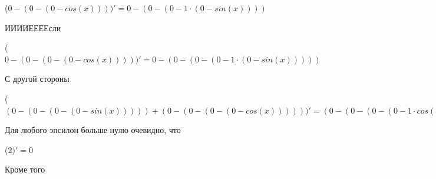 \documentclass[12pt,a4paper,fleqn]{article}
\begin{document}
\begin{center}
\begin{center}
\begin{center}
\begin{center}
\begin{center}
\begin{center}
\begin{center}
\begin{center}
\begin{center}
\begin{center}
\begin{center}
\begin{center}
\begin{center}
\begin{center}
\begin{center}
\begin{center}
\begin{center}
\begin{center}
\begin{center}
\begin{center}
\begin{center}
\begin{center}
\begin{center}
\begin{center}
\begin{center}
\begin{center}
\begin{center}
\begin{center}
\begin{center}
\begin{center}
\begin{center}
\begin{center}
\begin{center}
\begin{center}
\begin{center}
\begin{center}
\begin{center}
\begin{center}
\begin{center}
\begin{center}
\begin{center}
\begin{center}
\begin{center}
\begin{center}
\begin{center}
\begin{center}
\begin{center}
\begin{center}
\begin{center}
\begin{center}
\begin{center}
\begin{center}
\begin{center}
\begin{center}
\begin{center}
\begin{center}
\begin{center}
\begin{center}
\begin{center}
\begin{center}
\begin{center}
\begin{center}
\begin{center}
\begin{center}
\begin{center}
\begin{center}
\begin{center}
\begin{center}
\begin{center}
\begin{center}
\begin{center}
\begin{center}
\begin{center}
\begin{center}
\begin{center}
\begin{center}
\begin{center}
\begin{center}
\begin{center}
\begin{center}
\begin{center}
 ($0-(0-(0-cos(x))))'
  = 0-(0-(0-1 \cdot (0-sin(x))))$\end{center}
ИИИИЕЕЕЕсли\cite{link3}

\begin{center}
 ($0-(0-(0-(0-cos(x)))))'
  = 0-(0-(0-(0-1 \cdot (0-sin(x)))))$\end{center}
С другой стороны

\begin{center}
 ($(0-(0-(0-(0-sin(x)))))+(0-(0-(0-(0-cos(x))))))'
  = (0-(0-(0-(0-1 \cdot cos(x)))))+(0-(0-(0-(0-1 \cdot (0-sin(x))))))$\end{center}
Для любого эпсилон больше нулю очевидно, что

\begin{center}
 ($2)'
  = 0$\end{center}
Кроме того


\end{center}
\end{center}
\end{center}
\end{center}
\end{center}
\end{center}
\end{center}
\end{center}
\end{center}
\end{center}
\end{center}
\end{center}
\end{center}
\end{center}
\end{center}
\end{center}
\end{center}
\end{center}
\end{center}
\end{center}
\end{center}
\end{center}
\end{center}
\end{center}
\end{center}
\end{center}
\end{center}
\end{center}
\end{center}
\end{center}
\end{center}
\end{center}
\end{center}
\end{center}
\end{center}
\end{center}
\end{center}
\end{center}
\end{center}
\end{center}
\end{center}
\end{center}
\end{center}
\end{center}
\end{center}
\end{center}
\end{center}
\end{center}
\end{center}
\end{center}
\end{center}
\end{center}
\end{center}
\end{center}
\end{center}
\end{center}
\end{center}
\end{center}
\end{center}
\end{center}
\end{center}
\end{center}
\end{center}
\end{center}
\end{center}
\end{center}
\end{center}
\end{center}
\end{center}
\end{center}
\end{center}
\end{center}
\end{center}
\end{center}
\end{center}
\end{center}
\end{center}
\end{center}
\end{center}
\end{center}
\end{document}
